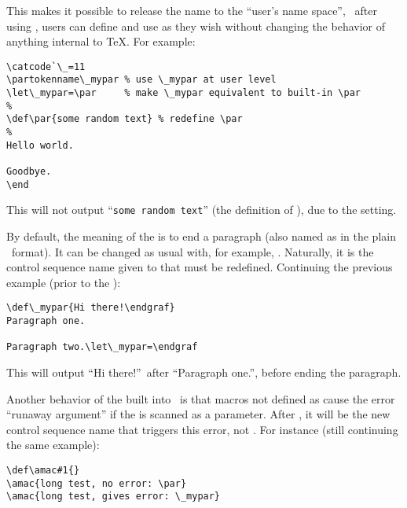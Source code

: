 \documentclass{pdftexmanual}
\begin{document}
This makes it possible to release the name  to the ``user's name
space'', \ie\ after using , users can define and use
 as they wish without changing the behavior of anything internal
to \TeX{}. For example:

\begin{verbatim}
\catcode`\_=11
\partokenname\_mypar % use \_mypar at user level
\let\_mypar=\par     % make \_mypar equivalent to built-in \par
%
\def\par{some random text} % redefine \par
%
Hello world.

Goodbye.
\end
\end{verbatim}

This will not output ``\verb|some random text|'' (the definition of
), due to the  setting.

By default, the meaning of the  is to end a paragraph
(also named as  in the plain \TEX\ format). It can be
changed as usual with, for example, . Naturally, it is the
control sequence name given to  that must be
redefined. Continuing the previous example (prior to the ):

\begin{verbatim}
\def\_mypar{Hi there!\endgraf}
Paragraph one.

Paragraph two.\let\_mypar=\endgraf
\end{verbatim}

This will output ``Hi there!''\ after ``Paragraph one.'', before ending
the paragraph.

Another behavior of the  built into \TEX\ is that
macros not defined as  cause the error ``runaway argument'' if
the  is scanned as a parameter. After
, it will be the new control sequence name that
triggers this error, not . For instance (still continuing the
same example):

\begin{verbatim}
\def\amac#1{}
\amac{long test, no error: \par}
\amac{long test, gives error: \_mypar}
\end{verbatim}


\subsection{}
\end{document}
